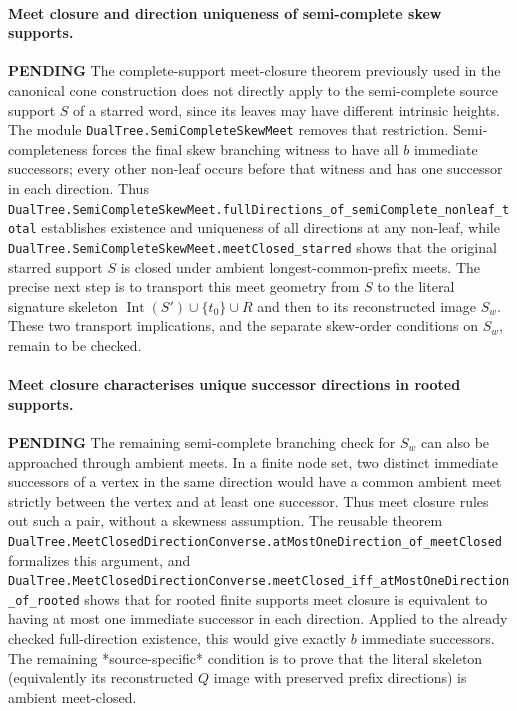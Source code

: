 \documentclass[11pt]{article}
\newcommand{\todo}{\textcolor{gray!70!black}{\textbf{PENDING}}}
\newcommand{\lean}[1]{\texttt{#1}}
\begin{document}
\paragraph{Meet closure and direction uniqueness of semi-complete skew supports.} \todo
The complete-support meet-closure theorem previously used in the
canonical cone construction does not directly apply to the
semi-complete source support $S$ of a starred word, since its leaves
may have different intrinsic heights.
The module \lean{DualTree.SemiCompleteSkewMeet} removes that
restriction.  Semi-completeness forces the final skew branching
witness to have all $b$ immediate successors; every other non-leaf
occurs before that witness and has one successor in each direction.
Thus
\lean{DualTree.SemiCompleteSkewMeet.fullDirections_of_semiComplete_nonleaf_total}
establishes existence and uniqueness of all directions at any non-leaf,
while \lean{DualTree.SemiCompleteSkewMeet.meetClosed_starred}
shows that the original starred support $S$ is closed under
ambient longest-common-prefix meets.
The precise next step is to transport this meet geometry from
$S$ to the literal signature skeleton
$\operatorname{Int}(S')\cup\{t_0\}\cup R$
and then to its reconstructed image $S_w$.
These two transport implications, and the separate skew-order
conditions on $S_w$, remain to be checked.


\paragraph{Meet closure characterises unique successor directions in rooted supports.} \todo
The remaining semi-complete branching check for $S_w$ can also be
approached through ambient meets.  In a finite node set, two
distinct immediate successors of a vertex in the same direction
would have a common ambient meet strictly between the vertex
and at least one successor.  Thus meet closure rules out such a
pair, without a skewness assumption.
The reusable theorem
\lean{DualTree.MeetClosedDirectionConverse.atMostOneDirection_of_meetClosed}
formalizes this argument, and
\lean{DualTree.MeetClosedDirectionConverse.meetClosed_iff_atMostOneDirection_of_rooted}
shows that for rooted finite supports meet closure is equivalent
to having at most one immediate successor in each direction.
Applied to the already checked full-direction existence,
this would give exactly $b$ immediate successors.
The remaining *source-specific* condition is to prove that
the literal skeleton (equivalently its reconstructed $Q$ image
with preserved prefix directions) is ambient meet-closed.
\end{document}
